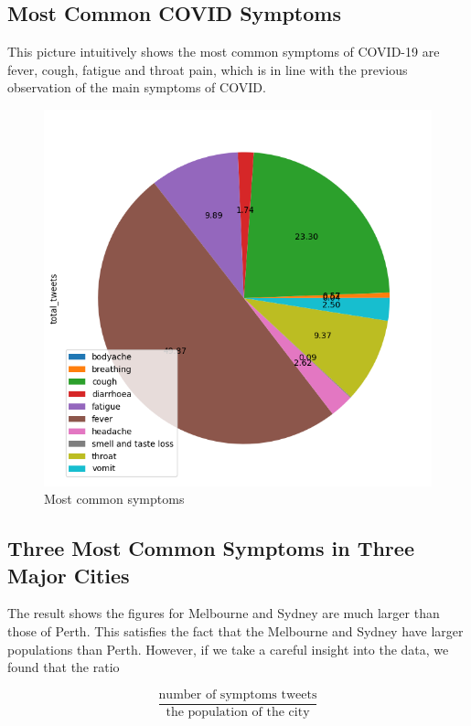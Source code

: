     \subsection{Most Common COVID Symptoms}
    
    This picture intuitively shows the most common symptoms of COVID-19 are fever, cough, fatigue and throat pain, which is in line with the previous observation of the main symptoms of COVID.
    \begin{figure}[H]
    \centering
    \includegraphics[scale=0.4]{city_analytics/georesults/symptoms_total_sa4.png}
    \caption{Most common symptoms}
    \label{fig:Most common symptoms}
    \end{figure}
    
    \subsection{Three Most Common Symptoms in Three Major Cities}
    The result shows the figures for Melbourne and Sydney are much larger than those of Perth. This satisfies the fact that the Melbourne and Sydney have larger populations than Perth. However, if we take a careful insight into the data, we found that the ratio 
    
    \[\frac{\text{number of symptoms tweets}}{\text{the population of the city}}\]
    
